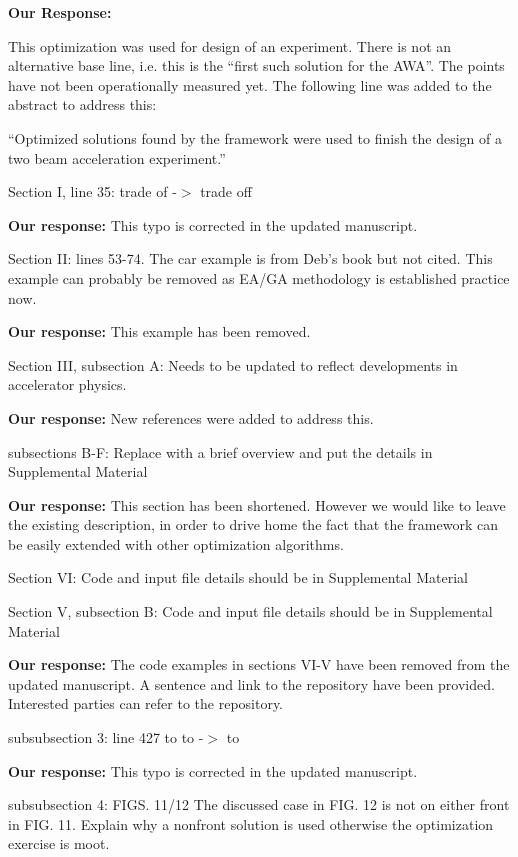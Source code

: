\documentclass{article}
\begin{document}
{\bf Our Response:} {\color{blue} This optimization was used for design of 
an experiment. There is not an alternative base line, i.e. this is the 
``first such solution for the AWA''. The points have not been operationally measured yet.
The following line was added to the abstract to address this: 

``Optimized solutions found by the framework were used to finish the design 
of a two beam acceleration experiment.''
}

Section I, line 35: trade of -$>$ trade off

{\bf Our response:} {\color{blue} This typo is corrected in the updated manuscript.}

Section II:
lines 53-74. The car example is from Deb’s book but not cited. This
example can probably be removed as EA/GA methodology is established
practice now.

{\bf Our response:} {\color{blue} This example has been removed.}

Section III, subsection A:
Needs to be updated to reflect developments in accelerator physics.

{\bf Our response:} {\color{blue} New references were added to address this.}

subsections B-F:
Replace with a brief overview and put the details in Supplemental
Material

{\bf Our response: } {\color{blue} This section has been shortened. However we would like to 
leave the existing description, in order to drive home the fact that the framework can be 
easily extended with other optimization algorithms.}

Section VI: 
Code and input file details should be in Supplemental Material

Section V, subsection B:
Code and input file details should be in Supplemental Material

{\bf Our response:} {\color{blue} The code examples in sections VI-V have been removed from the updated manuscript. 
	A sentence and link to the repository have been provided. Interested parties can refer to the repository.}

subsubsection 3:
line 427 to to -$>$ to

{\bf Our response:} {\color{blue} This typo is corrected in the updated manuscript.}

subsubsection 4:
FIGS. 11/12 The discussed case in FIG. 12 is not on either front in
FIG. 11. Explain why a nonfront solution is used otherwise the
optimization exercise is moot.
\end{document}
